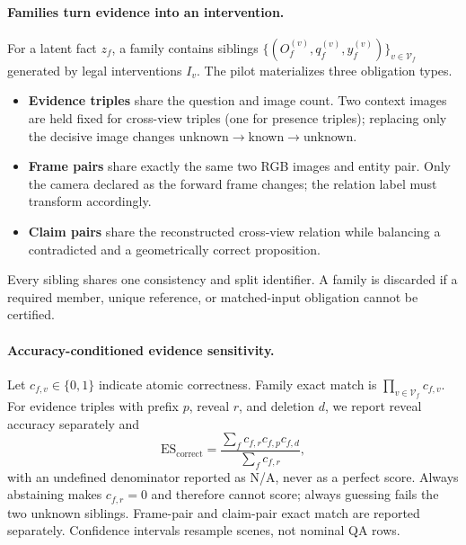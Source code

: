 \paragraph{Families turn evidence into an intervention.}
For a latent fact $z_f$, a family contains siblings
$\{(O_f^{(v)},q_f^{(v)},y_f^{(v)})\}_{v\in\mathcal V_f}$ generated by legal
interventions $I_v$.  The pilot materializes three obligation types.
\begin{itemize}
  \item \textbf{Evidence triples} share the question and image count.  Two
        context images are held fixed for cross-view triples (one for presence
        triples); replacing only the decisive image changes
        unknown$\rightarrow$known$\rightarrow$unknown.
  \item \textbf{Frame pairs} share exactly the same two RGB images and entity
        pair.  Only the camera declared as the forward frame changes; the
        relation label must transform accordingly.
  \item \textbf{Claim pairs} share the reconstructed cross-view relation while
        balancing a contradicted and a geometrically correct proposition.
\end{itemize}
Every sibling shares one consistency and split identifier.  A family is
discarded if a required member, unique reference, or matched-input obligation
cannot be certified.

\paragraph{Accuracy-conditioned evidence sensitivity.}
Let $c_{f,v}\in\{0,1\}$ indicate atomic correctness.  Family exact match is
$\prod_{v\in\mathcal V_f}c_{f,v}$.  For evidence triples with prefix $p$,
reveal $r$, and deletion $d$, we report reveal accuracy separately and
\begin{equation}
  \mathrm{ES}_{\mathrm{correct}}=
  \frac{\sum_f c_{f,r}c_{f,p}c_{f,d}}
       {\sum_f c_{f,r}},
  \label{eq:evidence-sensitivity}
\end{equation}
with an undefined denominator reported as N/A, never as a perfect score.
Always abstaining makes $c_{f,r}=0$ and therefore cannot score; always guessing
fails the two unknown siblings.  Frame-pair and claim-pair exact match are
reported separately.  Confidence intervals resample scenes, not nominal QA
rows.


